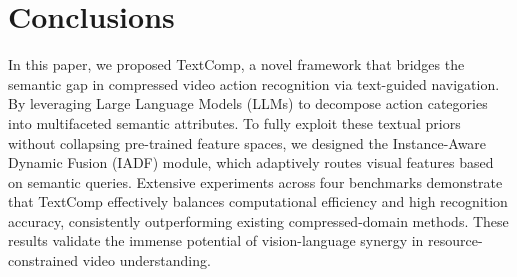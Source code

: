 \documentclass[letterpaper]{article} %
\begin{document}
\section{Conclusions}
\label{sec:conclusion}
In this paper, we proposed TextComp, a novel framework that bridges the semantic gap in compressed video action recognition via text-guided navigation. By leveraging Large Language Models (LLMs) to decompose action categories into multifaceted semantic attributes. To fully exploit these textual priors without collapsing pre-trained feature spaces, we designed the Instance-Aware Dynamic Fusion (IADF) module, which adaptively routes visual features based on semantic queries. Extensive experiments across four benchmarks demonstrate that TextComp effectively balances computational efficiency and high recognition accuracy, consistently outperforming existing compressed-domain methods. These results validate the immense potential of vision-language synergy in resource-constrained video understanding.




% 
\end{document}
